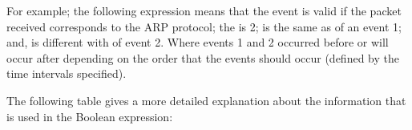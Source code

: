  For example; the following expression means that the event is valid if
the packet received corresponds to the ARP protocol;
the  is 2;  is the same as 
of an event 1; and,  is different with  of event 2. Where events 1 and 2 occurred before or will occur after depending on the order that the events should occur (defined by the time intervals specified).





The following table gives a more detailed explanation about the
information that is used in the Boolean expression:


